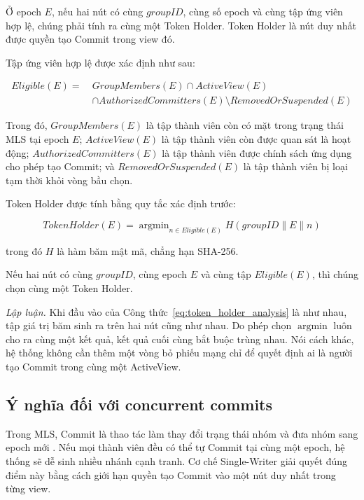 \documentclass[../DoAn.tex]{subfiles}
\begin{document}
Ở epoch $E$, nếu hai nút có cùng $groupID$, cùng số epoch và cùng tập ứng viên hợp lệ, chúng phải tính ra cùng một Token Holder. Token Holder là nút duy nhất được quyền tạo Commit trong view đó.

Tập ứng viên hợp lệ được xác định như sau:

\begin{equation}
	\label{eq:eligible_set_analysis}
	\begin{split}
		Eligible(E) =\ & GroupMembers(E) \cap ActiveView(E) \\
		& \cap AuthorizedCommitters(E) \setminus RemovedOrSuspended(E)
	\end{split}
\end{equation}

Trong đó, $GroupMembers(E)$ là tập thành viên còn có mặt trong trạng thái MLS tại epoch $E$; $ActiveView(E)$ là tập thành viên còn được quan sát là hoạt động; $AuthorizedCommitters(E)$ là tập thành viên được chính sách ứng dụng cho phép tạo Commit; và $RemovedOrSuspended(E)$ là tập thành viên bị loại tạm thời khỏi vòng bầu chọn.

Token Holder được tính bằng quy tắc xác định trước:

\begin{equation}
	\label{eq:token_holder_analysis}
	TokenHolder(E) =
	\operatorname{argmin}_{n \in Eligible(E)}
	H(groupID \parallel E \parallel n)
\end{equation}

trong đó $H$ là hàm băm mật mã, chẳng hạn SHA-256.

\begin{proposition}
\label{prop:single_writer}
Nếu hai nút có cùng $groupID$, cùng epoch $E$ và cùng tập $Eligible(E)$, thì chúng chọn cùng một Token Holder.
\end{proposition}

\textit{Lập luận.} Khi đầu vào của Công thức~\eqref{eq:token_holder_analysis} là như nhau, tập giá trị băm sinh ra trên hai nút cũng như nhau. Do phép chọn $\operatorname{argmin}$ luôn cho ra cùng một kết quả, kết quả cuối cùng bắt buộc trùng nhau. Nói cách khác, hệ thống không cần thêm một vòng bỏ phiếu mạng chỉ để quyết định ai là người tạo Commit trong cùng một ActiveView.

\subsection{Ý nghĩa đối với concurrent commits}

Trong MLS, Commit là thao tác làm thay đổi trạng thái nhóm và đưa nhóm sang epoch mới \cite{rfc9420}. Nếu mọi thành viên đều có thể tự Commit tại cùng một epoch, hệ thống sẽ dễ sinh nhiều nhánh cạnh tranh. Cơ chế Single-Writer giải quyết đúng điểm này bằng cách giới hạn quyền tạo Commit vào một nút duy nhất trong từng view.
\end{document}
